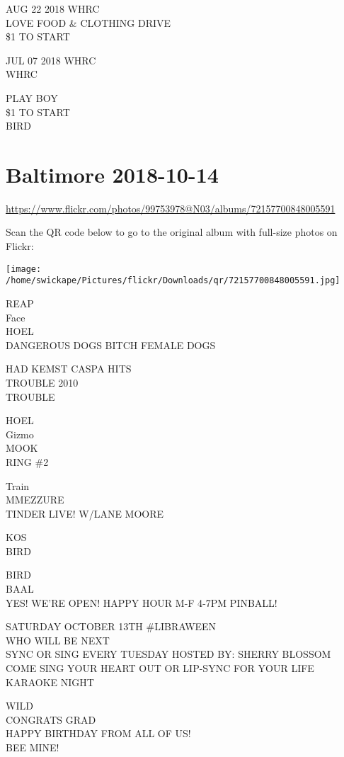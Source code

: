 \documentclass[10pt,letterpaper]{article}
\begin{document}
AUG 22 2018 WHRC\\
LOVE FOOD \& CLOTHING DRIVE\\
\$1 TO START

JUL 07 2018 WHRC\\
WHRC

PLAY BOY\\
\$1 TO START\\
BIRD


\section*{Baltimore 2018-10-14}

\url{https://www.flickr.com/photos/99753978@N03/albums/72157700848005591}

Scan the QR code below to go to the original album with full-size photos on Flickr:

\texttt{[image: /home/swickape/Pictures/flickr/Downloads/qr/72157700848005591.jpg]}


REAP\\
Face\\
HOEL\\
DANGEROUS DOGS BITCH FEMALE DOGS

HAD KEMST CASPA HITS\\
TROUBLE 2010\\
TROUBLE

HOEL\\
Gizmo\\
MOOK\\
RING \#2

Train\\
MMEZZURE\\
TINDER LIVE! W/LANE MOORE

KOS\\
BIRD

BIRD\\
BAAL\\
YES!  WE'RE OPEN!  HAPPY HOUR M{-}F 4{-}7PM PINBALL!

SATURDAY OCTOBER 13TH \#LIBRAWEEN\\
WHO WILL BE NEXT\\
SYNC OR SING EVERY TUESDAY HOSTED BY: SHERRY BLOSSOM COME SING YOUR HEART OUT OR LIP{-}SYNC FOR YOUR LIFE\\
KARAOKE NIGHT

WILD\\
CONGRATS GRAD\\
HAPPY BIRTHDAY FROM ALL OF US!\\
BEE MINE!
\end{document}
